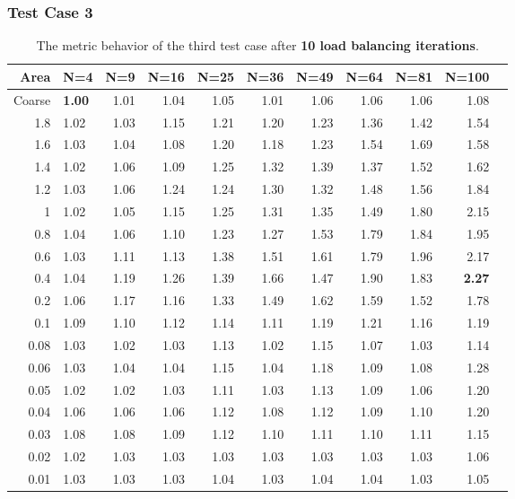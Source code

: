 \documentclass[]{beamer}
\begin{document}
\begin{frame}[t]\frametitle{Test Case 3}
\begin{table}[H]
\tiny
\centering
\caption{The metric behavior of the third test case after \textbf{10 load balancing iterations}.} 
\begin{tabular}{rlrrrrrrrrr}
  \hline
  Area & N=4 & N=9 & N=16 & N=25 & N=36 & N=49 & N=64 & N=81 & N=100 \\ 
  \hline
 Coarse & \textbf{\cellcolor{blue!25}1.00} & 1.01 & 1.04 & 1.05 & 1.01 & 1.06 & 1.06 & 1.06 & 1.08 \\ 
1.8 & 1.02 & 1.03 & 1.15 & 1.21 & 1.20 & 1.23 & 1.36 & 1.42 & 1.54 \\ 
  1.6 & 1.03 & 1.04 & 1.08 & 1.20 & 1.18 & 1.23 & 1.54 & 1.69 & 1.58 \\ 
1.4 & 1.02 & 1.06 & 1.09 & 1.25 & 1.32 & 1.39 & 1.37 & 1.52 & 1.62 \\ 
 1.2 & 1.03 & 1.06 & 1.24 & 1.24 & 1.30 & 1.32 & 1.48 & 1.56 & 1.84 \\ 
 1 & 1.02 & 1.05 & 1.15 & 1.25 & 1.31 & 1.35 & 1.49 & 1.80 & 2.15 \\ 
 0.8 & 1.04 & 1.06 & 1.10 & 1.23 & 1.27 & 1.53 & 1.79 & 1.84 & 1.95 \\ 
 0.6 & 1.03 & 1.11 & 1.13 & 1.38 & 1.51 & 1.61 & 1.79 & 1.96 & 2.17 \\ 
   0.4 & 1.04 & 1.19 & 1.26 & 1.39 & 1.66 & 1.47 & 1.90 & 1.83 & \textbf{\cellcolor{blue!25}2.27} \\ 
   0.2 & 1.06 & 1.17 & 1.16 & 1.33 & 1.49 & 1.62 & 1.59 & 1.52 & 1.78 \\ 
 0.1 & 1.09 & 1.10 & 1.12 & 1.14 & 1.11 & 1.19 & 1.21 & 1.16 & 1.19 \\ 
 0.08 & 1.03 & 1.02 & 1.03 & 1.13 & 1.02 & 1.15 & 1.07 & 1.03 & 1.14 \\ 
  0.06 & 1.03 & 1.04 & 1.04 & 1.15 & 1.04 & 1.18 & 1.09 & 1.08 & 1.28 \\ 
   0.05 & 1.02 & 1.02 & 1.03 & 1.11 & 1.03 & 1.13 & 1.09 & 1.06 & 1.20 \\ 
   0.04 & 1.06 & 1.06 & 1.06 & 1.12 & 1.08 & 1.12 & 1.09 & 1.10 & 1.20 \\ 
 0.03 & 1.08 & 1.08 & 1.09 & 1.12 & 1.10 & 1.11 & 1.10 & 1.11 & 1.15 \\ 
0.02 & 1.02 & 1.03 & 1.03 & 1.03 & 1.03 & 1.03 & 1.03 & 1.03 & 1.06 \\ 
 0.01 & 1.03 & 1.03 & 1.03 & 1.04 & 1.03 & 1.04 & 1.04 & 1.03 & 1.05 \\ 
   \hline
\end{tabular}
\end{table}
\end{frame}
\end{document}
